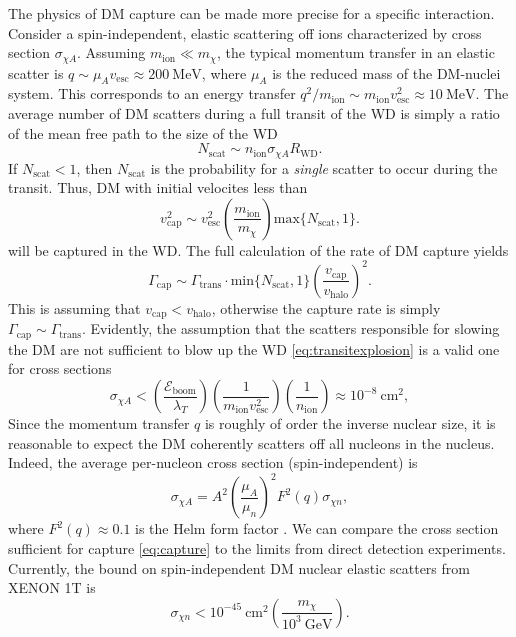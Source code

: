 \documentclass[preprintnumbers,amsmath,amssymb,prd,superscriptaddress]{revtex4}
\newcommand{\Eboom}{\mathcal{E}_\text{boom}}
\newcommand{\GeV}{\text{GeV}}
\newcommand{\MeV}{\text{MeV}}
\newcommand{\cm}{\text{cm}}
\def\r{\right)}
\def\l{\left(}
\begin{document}
The physics of DM capture can be made more precise for a specific interaction.
Consider a spin-independent, elastic scattering off ions characterized by cross section $\sigma_{\chi A}$. 
Assuming $m_\text{ion} \ll m_\chi$, the typical momentum transfer in an elastic scatter is $q \sim \mu_{A} v_\text{esc} \approx 200 ~\MeV$, where $\mu_{A}$ is the reduced mass of the DM-nuclei system. 
This corresponds to an energy transfer $q^2/m_\text{ion} \sim m_\text{ion} v_\text{esc}^2 \approx 10 ~\MeV$. 
The average number of DM scatters during a full transit of the WD is simply a ratio of the mean free path to the size of the WD
\begin{equation}
N_\text{scat} \sim n_\text{ion} \sigma_{\chi A} R_\text{WD}.
\end{equation}
If $N_\text{scat} < 1$, then $N_\text{scat}$ is the probability for a \emph{single} scatter to occur during the transit. 
Thus, DM with initial velocites less than
\begin{equation}
\label{eq:capture}
v_\text{cap}^2 \sim v_\text{esc}^2 \l \frac{m_\text{ion}}{m_\chi} \r \text{max}\{N_\text{scat} ,1\}.
\end{equation}
will be captured in the WD. 
The full calculation of the rate of DM capture \cite{Gould} yields 
\begin{equation}
\Gamma_\text{cap} \sim \Gamma_\text{trans} \cdot \text{min}\{N_\text{scat}, 1\} \l \frac{v_\text{cap}}{v_\text{halo}} \r^2.
\end{equation}
This is assuming that $v_\text{cap} < v_\text{halo}$, otherwise the capture rate is simply $\Gamma_\text{cap} \sim \Gamma_\text{trans}$. 
Evidently, the assumption that the scatters responsible for slowing the DM are not sufficient to blow up the WD \eqref{eq:transitexplosion} is a valid one for cross sections
\begin{equation}
\sigma_{\chi A} < \l \frac{\Eboom}{\lambda_T} \r \l \frac{1}{m_\text{ion} v_\text{esc}^2} \r \l \frac{1}{n_\text{ion}} \r \approx 10^{-8} ~\cm^2,
\end{equation}
Since the momentum transfer $q$ is roughly of order the inverse nuclear size, it is reasonable to expect the DM coherently scatters off all nucleons in the nucleus. 
Indeed, the average per-nucleon cross section (spin-independent) is
\begin{equation}
\sigma_{\chi A} = A^2 \l \frac{\mu_{A}}{\mu_{n}}\r^2 F^2(q) \sigma_{\chi n},
\end{equation}
where $F^2(q) \approx 0.1$ is the Helm form factor \cite{LUX thesis}.  
We can compare the cross section sufficient for capture \eqref{eq:capture} to the limits from direct detection experiments.
Currently, the bound on spin-independent DM nuclear elastic scatters from XENON 1T is
\begin{equation}
\label{eq:xenon}
\sigma_{\chi n} < 10^{-45} ~\text{cm}^2 \l \frac{m_\chi}{10^3 ~\GeV} \r.
\end{equation}
\end{document}
